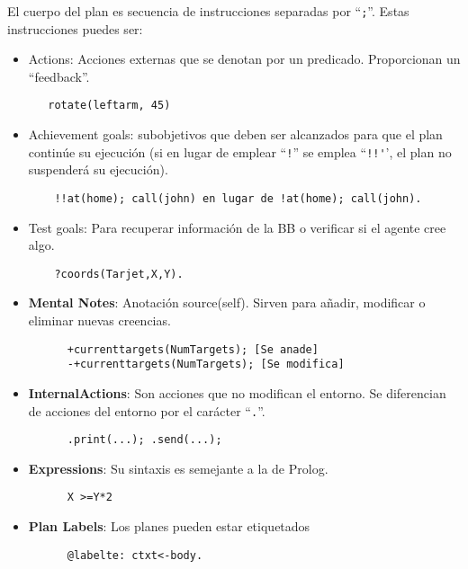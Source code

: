 El cuerpo del plan es secuencia de instrucciones separadas por ``\lstinline|;|''. Estas instrucciones puedes ser:\ns
\begin{itemize}
	\item Actions: Acciones externas que se denotan por un predicado.
	      Proporcionan un ``feedback''.
	      \begin{lstlisting}
   rotate(leftarm, 45)
         \end{lstlisting}
	\item Achievement goals: subobjetivos que deben ser alcanzados para que el
	      plan continúe su ejecución (si en lugar de emplear ``\lstinline|!|'' se emplea ``\lstinline|!!'|', el
	      plan no suspenderá su ejecución).
	      \begin{lstlisting}
	!!at(home); call(john) en lugar de !at(home); call(john).
         \end{lstlisting}
	\item Test goals: Para recuperar información de la BB o verificar si el agente
	      cree algo.
	      \begin{lstlisting}
	?coords(Tarjet,X,Y).
         \end{lstlisting}
   \item \textbf{Mental Notes}: Anotación source(self). Sirven para añadir, modificar o eliminar nuevas
   creencias.
   \begin{lstlisting}
      +currenttargets(NumTargets); [Se anade]
      -+currenttargets(NumTargets); [Se modifica]
   \end{lstlisting}
   \item \textbf{InternalActions}: Son acciones que no modifican el entorno. Se diferencian de acciones del
   entorno por el carácter ``\lstinline|.|''.
   \begin{lstlisting}
      .print(...); .send(...);
   \end{lstlisting}
   \item \textbf{Expressions}: Su sintaxis es semejante a la de Prolog.
   \begin{lstlisting}
      X >=Y*2
   \end{lstlisting}
   \item \textbf{Plan Labels}: Los planes pueden estar etiquetados
   \begin{lstlisting}
      @labelte: ctxt<-body.
   \end{lstlisting}
\end{itemize}

